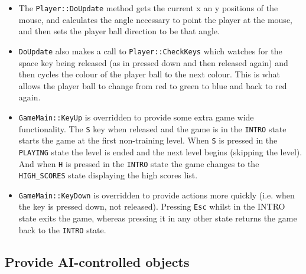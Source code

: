 \begin{itemize}
	\item The \verb!Player::DoUpdate! method gets the current x an y positions of the mouse, and calculates the angle necessary to point the player at the mouse, and then sets the player ball direction to be that angle.
	\item \verb!DoUpdate! also makes a call to \verb!Player::CheckKeys! which watches for the space key being released (as in pressed down and then released again) and then cycles the colour of the player ball to the next colour. This is what allows the player ball to change from red to green to blue and back to red again.
	\item \verb!GameMain::KeyUp! is overridden to provide some extra game wide functionality. The \verb!S! key when released and the game is in the \verb!INTRO! state starts the game at the first non-training level. When \verb!S! is pressed in the \verb!PLAYING! state the level is ended and the next level begins (skipping the level). And when \verb!H! is pressed in the \verb!INTRO! state the game changes to the \verb!HIGH_SCORES! state displaying the high scores list.
	\item \verb!GameMain::KeyDown! is overridden to provide actions more quickly (i.e. when the key is pressed down, not released). Pressing \verb!Esc! whilst in the INTRO state exits the game, whereas pressing it in any other state returns the game back to the \verb!INTRO! state.
\end{itemize}

\subsection{Provide AI-controlled objects}

